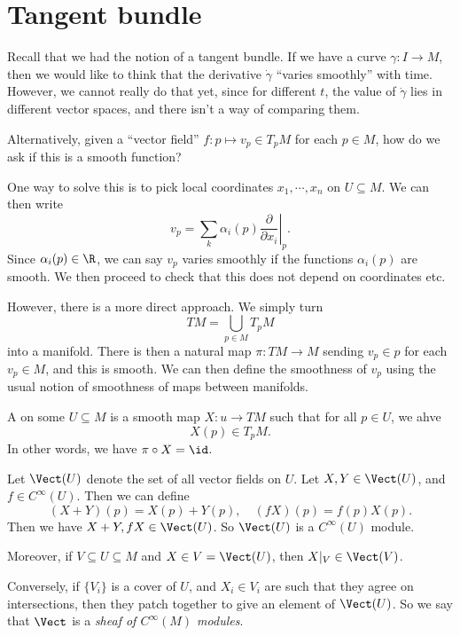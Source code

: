 \documentclass[a4paper]{article}
\begin{document}
\section{Tangent bundle}
Recall that we had the notion of a tangent bundle. If we have a curve $\gamma: I \to M$, then we would like to think that the derivative $\dot{\gamma}$ ``varies smoothly'' with time. However, we cannot really do that yet, since for different $t$, the value of $\dot{\gamma}$ lies in different vector spaces, and there isn't a way of comparing them.

Alternatively, given a ``vector field'' $f: p \mapsto v_p \in T_p M$ for each $p \in M$, how do we ask if this is a smooth function?

One way to solve this is to pick local coordinates $x_1, \cdots,x _n$ on $U \subseteq M$. We can then write
\[
  v_p = \sum_k \alpha_i(p) \left.\frac{\partial}{\partial x_i}\right|_p.
\]
Since $\alpha_i(p) \in \R$, we can say $v_p$ varies smoothly if the functions $\alpha_i(p)$ are smooth. We then proceed to check that this does not depend on coordinates etc.

However, there is a more direct approach. We simply turn
\[
  TM = \bigcup_{p \in M} T_p M
\]
into a manifold. There is then a natural map $\pi: TM \to M$ sending $v_p \in p$ for each $v_p \in M$, and this is smooth. We can then define the smoothness of $v_p$ using the usual notion of smoothness of maps between manifolds.

\begin{defi}
  A  on some $U \subseteq M$ is a smooth map $X: u \to TM$ such that for all $p \in U$, we ahve
  \[
    X(p) \in T_p M.
  \]
  In other words, we have $\pi \circ X = \id$.
\end{defi}

\begin{defi}[$\Vect(U)$]
  Let $\Vect(U)$ denote the set of all vector fields on $U$. Let $X, Y \in \Vect(U)$, and $f \in C^\infty(U)$. Then we can define
  \[
    (X + Y)(p) = X(p) + Y(p),\quad (fX)(p) = f(p) X(p).
  \]
  Then we have $X + Y, fX \in \Vect(U)$. So $\Vect(U)$ is a $C^\infty(U)$ module.

  Moreover, if $V \subseteq U \subseteq M$ and $X \in V=\Vect(U)$, then $X|_V \in \Vect(V)$.

  Conversely, if $\{V_i\}$ is a cover of $U$, and $X_i \in V_i$ are such that they agree on intersections, then they patch together to give an element of $\Vect(U)$. So we say that $\Vect$ is a \emph{sheaf of $C^\infty(M)$ modules}.
\end{defi}
\end{document}
